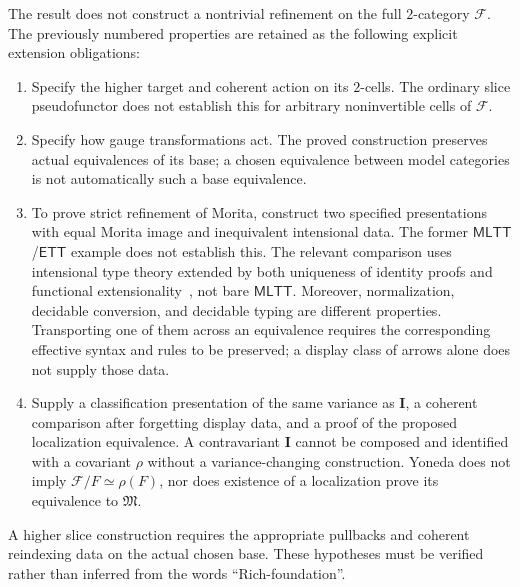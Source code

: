 \documentclass[11pt]{article}
\theoremstyle{plain}
\theoremstyle{definition}
\newcommand{\cF}{\mathcal{F}}
\newcommand{\fM}{\mathfrak{M}}
\newcommand{\MLTT}{\mathsf{MLTT}}
\newcommand{\ETT}{\mathsf{ETT}}
\newcommand{\II}{\mathbf{I}}
\begin{document}
The result does not construct a nontrivial refinement on the full $2$-category $\cF$. The previously numbered properties are retained as the following explicit extension obligations:
\begin{enumerate}
\item[\textbf{(I-1)}] Specify the higher target and coherent action on its $2$-cells. The ordinary slice pseudofunctor does not establish this for arbitrary noninvertible cells of $\cF$.
\item[\textbf{(I-2)}] Specify how gauge transformations act. The proved construction preserves actual equivalences of its base; a chosen equivalence between model categories is not automatically such a base equivalence.
\item[\textbf{(I-3)}] To prove strict refinement of Morita, construct two specified presentations with equal Morita image and inequivalent intensional data. The former $\MLTT$/$\ETT$ example does not establish this. The relevant comparison uses intensional type theory extended by both uniqueness of identity proofs and functional extensionality~\cite{KapulkinLi2025}, not bare $\MLTT$. Moreover, normalization, decidable conversion, and decidable typing are different properties. Transporting one of them across an equivalence requires the corresponding effective syntax and rules to be preserved; a display class of arrows alone does not supply those data.
\item[\textbf{(I-4)}] Supply a classification presentation of the same variance as $\II$, a coherent comparison after forgetting display data, and a proof of the proposed localization equivalence. A contravariant $\II$ cannot be composed and identified with a covariant $\rho$ without a variance-changing construction. Yoneda does not imply $\cF/F\simeq\rho(F)$, nor does existence of a localization prove its equivalence to $\fM$.
\end{enumerate}
A higher slice construction requires the appropriate pullbacks and coherent reindexing data on the actual chosen base. These hypotheses must be verified rather than inferred from the words ``Rich-foundation''.
\end{document}
